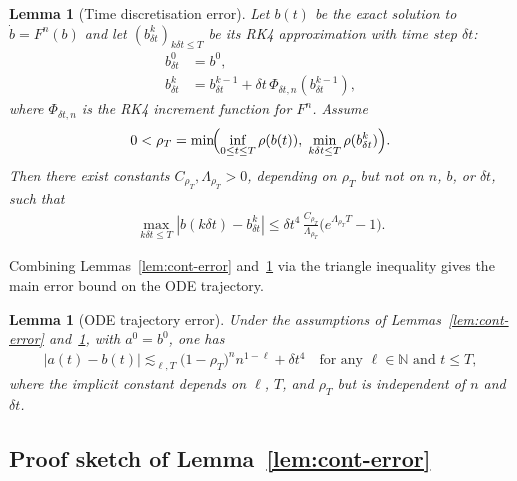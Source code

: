 \documentclass[12pt, a4paper]{article}
\theoremstyle{plain}
\newtheorem{lemma}[theorem]{Lemma}
\theoremstyle{definition}
\newcommand{\N}{\mathbb{N}}
\newcommand{\abs}[1]{\left\lvert #1 \right\rvert}
\begin{document}
\begin{lemma}[Time discretisation error]
  \label{lem:time-error}
  Let $b(t)$ be the exact solution to $\dot b = F^n(b)$
  and let $(b^k_{\delta t})_{k\delta t \le T}$ be its RK4 approximation
  with time step $\delta t$:
  \begin{align*}
    b^0_{\delta t} &= b^0, \\
    b^k_{\delta t} &= b^{k-1}_{\delta t}
                     + \delta t\,\Phi_{\delta t,n}(b^{k-1}_{\delta t}),
  \end{align*}
  where $\Phi_{\delta t,n}$ is the RK4 increment function for $F^n$.
  Assume
  \[
    0 < \rho_T
    = \min\!\Bigl(
        \inf_{0 \le t \le T}\rho(b(t)),\;
        \min_{k\delta t \le T}\rho(b^k_{\delta t})
      \Bigr).
  \]
  Then there exist constants $C_{\rho_T}, \Lambda_{\rho_T} > 0$,
  depending on $\rho_T$ but not on $n$, $b$, or $\delta t$, such that
  \begin{align}
    \max_{k\delta t \le T} \abs{b(k\delta t) - b^k_{\delta t}}
    \le \delta t^4\,\frac{C_{\rho_T}}{\Lambda_{\rho_T}}
        \bigl(e^{\Lambda_{\rho_T}T} - 1\bigr).
    \label{eq:time-error}
  \end{align}
\end{lemma}

Combining Lemmas~\ref{lem:cont-error} and~\ref{lem:time-error} via the
triangle inequality gives the main error bound on the ODE trajectory.

\begin{lemma}[ODE trajectory error]
  \label{lem:ODE-error}
  Under the assumptions of Lemmas~\ref{lem:cont-error}
  and~\ref{lem:time-error}, with $a^0 = b^0$, one has
  \begin{align}
    \abs{a(t) - b(t)}
    \lesssim_{\ell,T}
    \bigl(1 - \rho_T\bigr)^n n^{1-\ell} + \delta t^4
    \quad\text{for any } \ell \in \N \text{ and } t \le T,
    \label{eq:ODE-error}
  \end{align}
  where the implicit constant depends on $\ell$, $T$, and $\rho_T$
  but is independent of $n$ and $\delta t$.
\end{lemma}

\subsection{Proof sketch of Lemma~\ref{lem:cont-error}}
\end{document}
